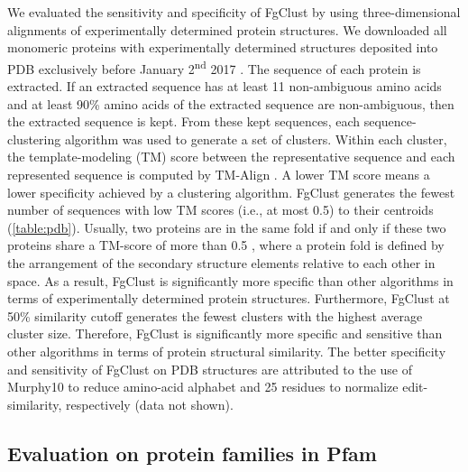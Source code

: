 \documentclass[11pt,letterpaper]{article}
\begin{document}
We evaluated the sensitivity and specificity of FgClust by using three-dimensional alignments of experimentally determined protein structures.
We downloaded all monomeric proteins with experimentally determined structures deposited into PDB exclusively before January 2\textsuperscript{nd} 2017 \citep{berman2006protein}.
The sequence of each protein is extracted.
If an extracted sequence has at least 11 non-ambiguous amino acids and at least 90\% amino acids of the extracted sequence are non-ambiguous, then the extracted sequence is kept.
From these kept sequences, each sequence-clustering algorithm was used to generate a set of clusters.
Within each cluster, the template-modeling (TM) score between the representative sequence and each represented sequence is computed by TM-Align \citep{zhang2005tm}.
A lower TM score means a lower specificity achieved by a clustering algorithm.
FgClust generates the fewest number of sequences with low TM scores (i.e., at most 0.5) to their centroids (\cref{table:pdb}).
Usually, two proteins are in the same fold if and only if these two proteins share a TM-score of more than 0.5 \citep{xu2010significant}, where a protein fold is defined by the arrangement of the secondary structure elements relative to each other in space.
As a result, FgClust is significantly more specific than other algorithms in terms of experimentally determined protein structures.
Furthermore, FgClust at 50\% similarity cutoff generates the fewest clusters with the highest average cluster size.
Therefore, FgClust is significantly more specific and sensitive than other algorithms in terms of protein structural similarity.
The better specificity and sensitivity of FgClust on PDB structures are attributed to the use of Murphy10 to reduce amino-acid alphabet and 25 residues to normalize edit-similarity, respectively (data not shown).

\subsection{Evaluation on protein families in Pfam}
\end{document}
